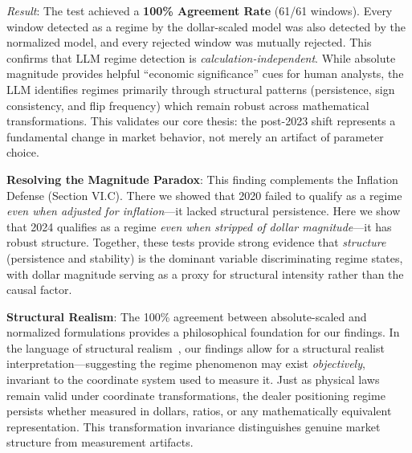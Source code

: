 \vspace{0.2cm}

\noindent\textit{Result}: The test achieved a \textbf{100\% Agreement Rate} (61/61 windows). Every window detected as a regime by the dollar-scaled model was also detected by the normalized model, and every rejected window was mutually rejected. This confirms that LLM regime detection is \textit{calculation-independent}. While absolute magnitude provides helpful ``economic significance'' cues for human analysts, the LLM identifies regimes primarily through structural patterns (persistence, sign consistency, and flip frequency) which remain robust across mathematical transformations. This validates our core thesis: the post-2023 shift represents a fundamental change in market behavior, not merely an artifact of parameter choice.

\vspace{0.2cm}

\noindent\textbf{Resolving the Magnitude Paradox}: This finding complements the Inflation Defense (Section VI.C). There we showed that 2020 failed to qualify as a regime \textit{even when adjusted for inflation}---it lacked structural persistence. Here we show that 2024 qualifies as a regime \textit{even when stripped of dollar magnitude}---it has robust structure. Together, these tests provide strong evidence that \textit{structure} (persistence and stability) is the dominant variable discriminating regime states, with dollar magnitude serving as a proxy for structural intensity rather than the causal factor.

\vspace{0.2cm}

\noindent\textbf{Structural Realism}: The 100\% agreement between absolute-scaled and normalized formulations provides a philosophical foundation for our findings. In the language of structural realism~\citep{worrall1989structural}, our findings allow for a structural realist interpretation---suggesting the regime phenomenon may exist \textit{objectively}, invariant to the coordinate system used to measure it. Just as physical laws remain valid under coordinate transformations, the dealer positioning regime persists whether measured in dollars, ratios, or any mathematically equivalent representation. This transformation invariance distinguishes genuine market structure from measurement artifacts.

\vspace{0.2cm}

